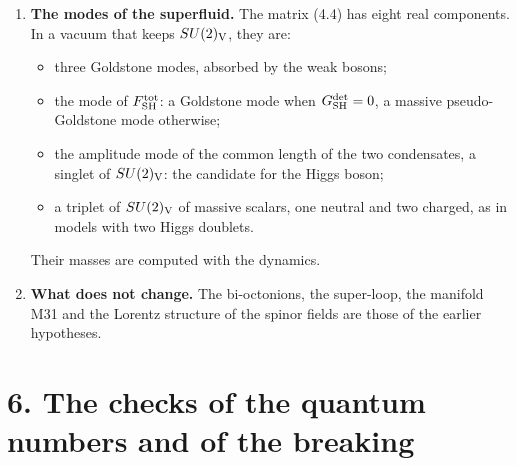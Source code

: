 \documentclass[
  10pt,
]{article}
\providecommand{\tightlist}{%
  \setlength{\itemsep}{0pt}\setlength{\parskip}{0pt}}
\begin{document}
\begin{enumerate}
  On 22 November 2026 the author chose (c): the interaction (4.2a). It
  respects \(SU(2)_L\times U(1)_Y\) and the custodial symmetry, and it
  gives the mode a mass, so the particle becomes a pseudo-Goldstone
  boson. In the effective Lagrangian
  \(Z_{\rm SH}\,\mathrm{tr}\big((\partial\mathcal M_{\rm SH})^\dagger\partial\mathcal M_{\rm SH}\big)-V(\mathcal M_{\rm SH})\)
  of the pair fields, with a kinetic coefficient \(Z_{\rm SH}\) and the
  term \(-G^{\rm det}_{\rm SH}(\det\mathcal M_{\rm SH}+{\rm c.c.})\) in
  the potential \(V\), the phase common to both pair fields, which the
  particle number rotates, gets the squared mass
  \(2G^{\rm det}_{\rm SH}/Z_{\rm SH}\): the relation of Gell-Mann, Oakes
  and Renner for a symmetry that is broken both spontaneously and,
  weakly, explicitly. The stages before the decision computed (a), the
  case \(G^{\rm det}_{\rm SH}=0\); the mass in each method, beyond the
  effective Lagrangian, is computed after the decision.
\item
  \textbf{The modes of the superfluid.} The matrix (4.4) has eight real
  components. In a vacuum that keeps \(SU(2)_{\rm V}\), they are:

  \begin{itemize}
  \tightlist
  \item
    three Goldstone modes, absorbed by the weak bosons;
  \item
    the mode of \(F^{\rm tot}_{\rm SH}\): a Goldstone mode when
    \(G^{\rm det}_{\rm SH}=0\), a massive pseudo-Goldstone mode
    otherwise;
  \item
    the amplitude mode of the common length of the two condensates, a
    singlet of \(SU(2)_{\rm V}\): the candidate for the Higgs boson;
  \item
    a triplet of \(SU(2)_{\rm V}\) of massive scalars, one neutral and
    two charged, as in models with two Higgs doublets.
  \end{itemize}

  Their masses are computed with the dynamics.
\item
  \textbf{What does not change.} The bi-octonions, the super-loop, the
  manifold M31 and the Lorentz structure of the spinor fields are those
  of the earlier hypotheses.
\end{enumerate}

\hypertarget{the-checks-of-the-quantum-numbers-and-of-the-breaking}{%
\section{6. The checks of the quantum numbers and of the
breaking}\label{the-checks-of-the-quantum-numbers-and-of-the-breaking}}
\end{document}
